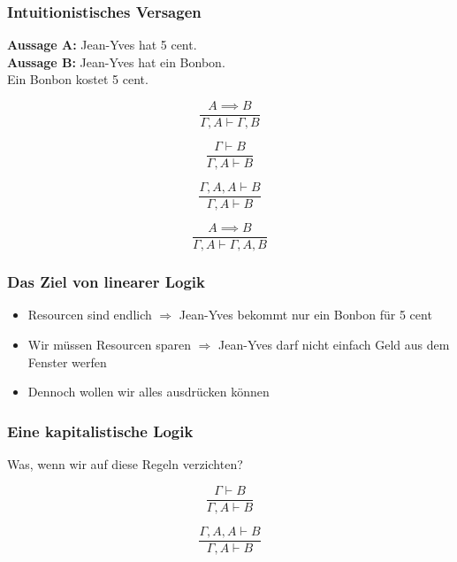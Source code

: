 \documentclass{beamer}
\begin{document}
\begin{frame}
  \frametitle{Intuitionistisches Versagen}
  \textbf{Aussage A:} Jean-Yves hat 5 cent.\\
  \textbf{Aussage B:} Jean-Yves hat ein Bonbon.\\
  Ein Bonbon kostet 5 cent.\\ \pause%

  \begin{equation}
    \frac{A \implies B}
         {\Gamma, A \vdash \Gamma, B}
  \end{equation}
  
  \pause%
  
  \begin{equation}
    \frac{\Gamma \vdash B}
         {\Gamma, A \vdash B}
  \end{equation}
  
  \pause%
 
  \begin{equation}
    \frac{\Gamma, A, A \vdash B}
         {\Gamma, A \vdash B}
  \end{equation}

  \pause%

  \begin{equation}
    \frac{A \implies B}
         {\Gamma, A \vdash \Gamma, A, B}
  \end{equation}
\end{frame}

\begin{frame}
  \frametitle{Das Ziel von linearer Logik}
  \begin{itemize}[<+->]
    \item Resourcen sind endlich $\Rightarrow$ Jean-Yves bekommt nur ein Bonbon für 5 cent
    \item Wir müssen Resourcen sparen $\Rightarrow$ Jean-Yves darf nicht einfach Geld aus dem Fenster werfen
    \item Dennoch wollen wir alles ausdrücken können
  \end{itemize}
\end{frame}

\begin{frame}
  \frametitle{Eine kapitalistische Logik}

  Was, wenn wir auf diese Regeln verzichten?

  
  \begin{equation*}
    \frac{\Gamma \vdash B}
         {\Gamma, A \vdash B}
  \end{equation*}
 
  \begin{equation*}
    \frac{\Gamma, A, A \vdash B}
         {\Gamma, A \vdash B}
  \end{equation*}

\end{frame}
\end{document}
